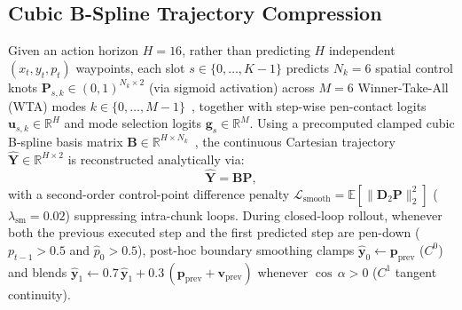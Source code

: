 \documentclass[10pt,twocolumn]{article}
\begin{document}
\subsection{Cubic B-Spline Trajectory Compression}
Given an action horizon $H=16$, rather than predicting $H$ independent $(x_t, y_t, p_t)$ waypoints, each slot $s \in \{0, \dots, K-1\}$ predicts $N_k=6$ spatial control knots $\mathbf{P}_{s,k} \in (0,1)^{N_k \times 2}$ (via sigmoid activation) across $M=6$ Winner-Take-All (WTA) modes $k \in \{0, \dots, M-1\}$~\cite{guzman2012,rupprecht2017}, together with step-wise pen-contact logits $\mathbf{u}_{s,k} \in \mathbb{R}^{H}$ and mode selection logits $\mathbf{g}_s \in \mathbb{R}^M$. Using a precomputed clamped cubic B-spline basis matrix $\mathbf{B} \in \mathbb{R}^{H \times N_k}$~\cite{piegl1997}, the continuous Cartesian trajectory $\hat{\mathbf{Y}} \in \mathbb{R}^{H \times 2}$ is reconstructed analytically via:
\begin{equation}
    \hat{\mathbf{Y}} = \mathbf{B}\mathbf{P},
\end{equation}
with a second-order control-point difference penalty $\mathcal{L}_{\text{smooth}} = \mathbb{E}[\|\mathbf{D}_2 \mathbf{P}\|_2^2]$ ($\lambda_{\text{sm}}=0.02$) suppressing intra-chunk loops. During closed-loop rollout, whenever both the previous executed step and the first predicted step are pen-down ($p_{t-1} > 0.5$ and $\hat{p}_0 > 0.5$), post-hoc boundary smoothing clamps $\hat{\mathbf{y}}_0 \leftarrow \mathbf{p}_{\text{prev}}$ ($C^0$) and blends $\hat{\mathbf{y}}_1 \leftarrow 0.7\,\hat{\mathbf{y}}_1 + 0.3\,(\mathbf{p}_{\text{prev}} + \mathbf{v}_{\text{prev}})$ whenever $\cos\,\alpha > 0$ ($C^1$ tangent continuity).
\end{document}
